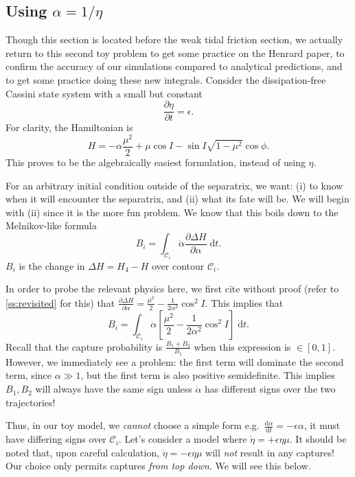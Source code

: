 \documentclass[11pt,
        usenames, %
        dvipsnames %
    ]{article}
\newcommand*{\rd}[2]{\frac{\mathrm{d}#1}{\mathrm{d}#2}}
\newcommand*{\pd}[2]{\frac{\partial#1}{\partial#2}}
\newcommand*{\s}[1]{\left[#1\right]}
\begin{document}
\subsection{Using $\alpha = 1/\eta$}

Though this section is located before the weak tidal friction section, we
actually return to this second toy problem to get some practice on the Henrard
paper, to confirm the accuracy of our simulations compared to analytical
predictions, and to get some practice doing these new integrals. Consider the
dissipation-free Cassini state system with a small but constant
\begin{equation}
    \pd{\eta}{t} = \epsilon.\label{eq:p2_eom}
\end{equation}
For clarity, the Hamiltonian is
\begin{equation}
    H = -\alpha\frac{\mu^2}{2} +
        \mu \cos I - \sin I \sqrt{1 - \mu^2} \cos \phi.
\end{equation}
This proves to be the algebraically easiest formulation, instead of using
$\eta$.

For an arbitrary initial condition outside of the separatrix, we want: (i) to
know when it will encounter the separatrix, and (ii) what its fate will be. We
will begin with (ii) since it is the more fun problem. We know that this boils
down to the Melnikov-like formula
\begin{equation}
    B_i = \int_{\mathcal{C}_i} \dot{\alpha}\pd{\Delta H}{\alpha}
        \;\mathrm{d}t.
\end{equation}
$B_i$ is the change in $\Delta H = H_4 - H$ over contour $\mathcal{C}_i$.

In order to probe the relevant physics here, we first cite without proof (refer
to \autoref{ss:revisited} for this) that $\pd{\Delta H}{\alpha} =
\frac{\mu^2}{2} - \frac{1}{2\alpha^2}\cos^2 I$. This implies that
\begin{equation}
    B_i = \int_{\mathcal{C}_i} \dot{\alpha}\s{
        \frac{\mu^2}{2} - \frac{1}{2\alpha^2}\cos^2 I}
        \;\mathrm{d}t.
\end{equation}
Recall that the capture probability is $\frac{B_1 + B_2}{B_1}$ when this
expression is $\in [0, 1]$. However, we immediately see a problem: the first
term will dominate the second term, since $\alpha \gg 1$, but the first term is
also positive semidefinite. This implies $B_1, B_2$ will always have the same
sign unless $\dot{\alpha}$ has different signs over the two trajectories!

Thus, in our toy model, we \emph{cannot} choose a simple form e.g.\
$\rd{\alpha}{t} = -\epsilon\alpha$, it must have differing signs over
$\mathcal{C}_i$. Let's consider a model where $\dot{\eta} = +\epsilon \eta \mu$.
It should be noted that, upon careful calculation, $\dot{\eta} = -\epsilon \eta
\mu$ will \emph{not} result in any captures! Our choice only permits captures
\emph{from top down}. We will see this below.
\end{document}
